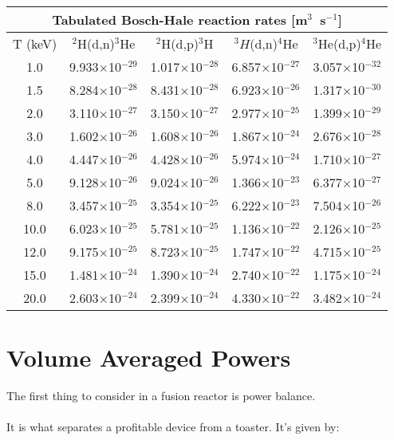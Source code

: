 \begin{table}[h!]\small
  \noindent
  \centering
  \begin{tabular}{c | c c | c | c}
    \multicolumn{5}{c}{Tabulated Bosch-Hale reaction rates [m$^3$~s$^{-1}$]}\\
    \hline
    T (keV) & $^2$H(d,n)$^3$He & $^2$H(d,p)$^3$H & $^3H$(d,n)$^4$He & $^3$He(d,p)$^4$He\\
    \hline\hline
    1.0& 9.933$\times$10$^{-29}$ & 1.017$\times$10$^{-28}$ & 6.857$\times$10$^{-27}$ & 3.057$\times$10$^{-32}$ \\
    1.5  & 8.284$\times$10$^{-28}$ & 8.431$\times$10$^{-28}$ & 6.923$\times$10$^{-26}$ & 1.317$\times$10$^{-30}$ \\
    2.0  & 3.110$\times$10$^{-27}$ & 3.150$\times$10$^{-27}$ & 2.977$\times$10$^{-25}$ & 1.399$\times$10$^{-29}$ \\
    3.0  & 1.602$\times$10$^{-26}$ & 1.608$\times$10$^{-26}$ & 1.867$\times$10$^{-24}$ & 2.676$\times$10$^{-28}$ \\
    4.0  & 4.447$\times$10$^{-26}$ & 4.428$\times$10$^{-26}$ & 5.974$\times$10$^{-24}$ & 1.710$\times$10$^{-27}$ \\
    5.0  & 9.128$\times$10$^{-26}$ & 9.024$\times$10$^{-26}$ & 1.366$\times$10$^{-23}$ & 6.377$\times$10$^{-27}$ \\
    8.0  & 3.457$\times$10$^{-25}$ & 3.354$\times$10$^{-25}$ & 6.222$\times$10$^{-23}$ & 7.504$\times$10$^{-26}$ \\
   10.0  & 6.023$\times$10$^{-25}$ & 5.781$\times$10$^{-25}$ & 1.136$\times$10$^{-22}$ & 2.126$\times$10$^{-25}$ \\
   12.0  & 9.175$\times$10$^{-25}$ & 8.723$\times$10$^{-25}$ & 1.747$\times$10$^{-22}$ & 4.715$\times$10$^{-25}$ \\
   15.0  & 1.481$\times$10$^{-24}$ & 1.390$\times$10$^{-24}$ & 2.740$\times$10$^{-22}$ & 1.175$\times$10$^{-24}$ \\
   20.0& 2.603$\times$10$^{-24}$ & 2.399$\times$10$^{-24}$ & 4.330$\times$10$^{-22}$ & 3.482$\times$10$^{-24}$ \\
   \hline
  \end{tabular}
  \label{table:rr}
\end{table}

\section{Volume Averaged Powers}

The first thing to consider in a fusion reactor is power balance. \\ \\ It is what separates a profitable device from a toaster. It's given by:

